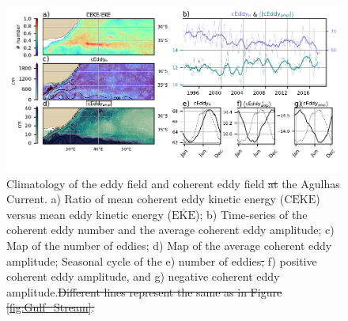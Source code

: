 \documentclass[draft,linenumbers]{agujournal2019}
\newcommand{\MEKE}{\overline{\textrm{EKE}}}
\newcommand{\MCEKE}{\overline{\textrm{CEKE}}}
\providecommand{\DIFadd}[1]{{\protect\color{blue}\uwave{#1}}} %
\providecommand{\DIFdel}[1]{{\protect\color{red}\sout{#1}}}                      %
\providecommand{\DIFaddFL}[1]{\DIFadd{#1}} %
\providecommand{\DIFdelFL}[1]{\DIFdel{#1}} %
\providecommand{\DIFaddbeginFL}{} %
\providecommand{\DIFaddendFL}{} %
\providecommand{\DIFdelbeginFL}{} %
\providecommand{\DIFdelendFL}{} %
\begin{document}
	\begin{figure}
	    \centering
	    \includegraphics[width=1\textwidth]{figures/regional_ratios_and_stats_V3_2.pdf}
	    \caption{\DIFaddbeginFL \DIFaddFL{As in Figure \ref{fig:Gulf_Stream}, }\DIFaddendFL Climatology of the eddy field and coherent eddy field \DIFdelbeginFL \DIFdelFL{at }\DIFdelendFL \DIFaddbeginFL \DIFaddFL{in }\DIFaddendFL the Agulhas Current. a) Ratio of mean coherent eddy kinetic energy ($\MCEKE$) versus mean eddy kinetic energy ($\MEKE$); b) Time-series of the coherent eddy number and the average coherent eddy amplitude; c) Map of the number of eddies; d) Map of the average coherent eddy amplitude; Seasonal cycle of the e) number of eddies\DIFdelbeginFL \DIFdelFL{, }\DIFdelendFL \DIFaddbeginFL \DIFaddFL{; }\DIFaddendFL f) positive coherent eddy amplitude, and g) negative coherent eddy amplitude.\DIFdelbeginFL \DIFdelFL{Different lines represent the same as in Figure \ref{fig:Gulf_Stream}.}\DIFdelendFL }
	    \label{fig:Agulhas}
	\end{figure}
\end{document}
